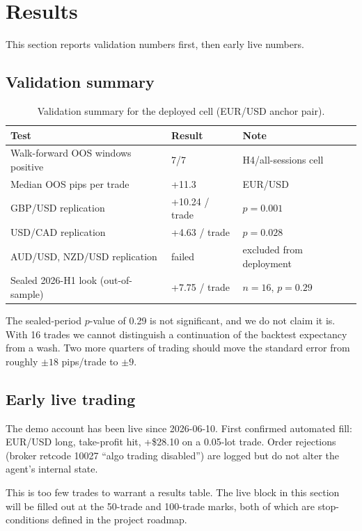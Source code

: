 \documentclass[11pt,a4paper]{article}
\begin{document}
\section{Results}\label{sec:results}

This section reports validation numbers first, then early live numbers.

\subsection{Validation summary}

\begin{table}[h]
\centering
\caption{Validation summary for the deployed cell (EUR/USD anchor pair).}
\label{tab:val}
\begin{tabular}{lll}
\toprule
Test & Result & Note \\
\midrule
Walk-forward OOS windows positive & 7/7 & H4/all-sessions cell \\
Median OOS pips per trade & +11.3 & EUR/USD \\
GBP/USD replication & +10.24 / trade & $p=0.001$ \\
USD/CAD replication & +4.63 / trade & $p=0.028$ \\
AUD/USD, NZD/USD replication & failed & excluded from deployment \\
Sealed 2026-H1 look (out-of-sample) & +7.75 / trade & $n=16$, $p=0.29$ \\
\bottomrule
\end{tabular}
\end{table}

The sealed-period $p$-value of 0.29 is not significant, and we do not
claim it is. With 16 trades we cannot distinguish a continuation of the
backtest expectancy from a wash. Two more quarters of trading should
move the standard error from roughly $\pm 18$ pips/trade to $\pm 9$.

\subsection{Early live trading}

The demo account has been live since 2026-06-10. First confirmed
automated fill: EUR/USD long, take-profit hit, +\$28.10 on a 0.05-lot
trade. Order rejections (broker retcode 10027 \enquote{algo trading
disabled}) are logged but do not alter the agent's internal state.

This is too few trades to warrant a results table. The live block in
this section will be filled out at the 50-trade and 100-trade marks,
both of which are stop-conditions defined in the project roadmap.
\end{document}
